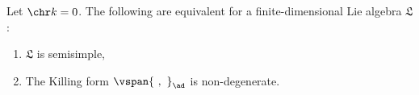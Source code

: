 Let $\chr k = 0$. The following are equivalent for a finite-dimensional
Lie algebra $\mathfrak{L}$:
\begin{enumerate}[label=(\arabic*)]
	\item $\mathfrak{L}$ is semisimple,
	\item The Killing form $\vspan{\ ,\ }_{\ad}$ is non-degenerate.
\end{enumerate}
